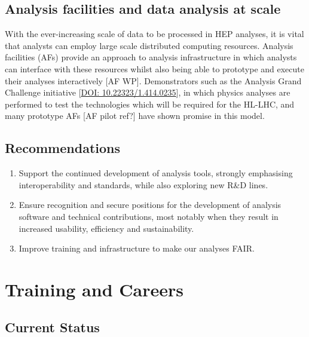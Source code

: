 \subsection{Analysis facilities and data analysis at
scale}\label{analysis-facilities-and-data-analysis-at-scale}

With the ever-increasing scale of data to be processed in HEP analyses,
it is vital that analysts can employ large scale distributed computing
resources. Analysis facilities (AFs) provide an approach to analysis
infrastructure in which analysts can interface with these resources
whilst also being able to prototype and execute their analyses
interactively {[}AF WP{]}. Demonstrators such as the Analysis Grand
Challenge initiative
{[}\href{https://doi.org/10.22323/1.414.0235}{\ul{DOI:
10.22323/1.414.0235}}{]}, in which physics analyses are performed to
test the technologies which will be required for the HL-LHC, and many
prototype AFs {[}AF pilot ref?{]} have shown promise in this model.

\subsection{Recommendations}\label{recommendations-3}

\begin{enumerate}
\def\labelenumi{\arabic{enumi}.}
\item
  Support the continued development of analysis tools, strongly
  emphasising interoperability and standards, while also exploring new
  R\&D lines.
\item
  Ensure recognition and secure positions for the development of
  analysis software and technical contributions, most notably when they
  result in increased usability, efficiency and sustainability.
\item
  Improve training and infrastructure to make our analyses FAIR.
\end{enumerate}

\section{Training and Careers}\label{training-and-careers}

\subsection{Current Status}\label{current-status}

